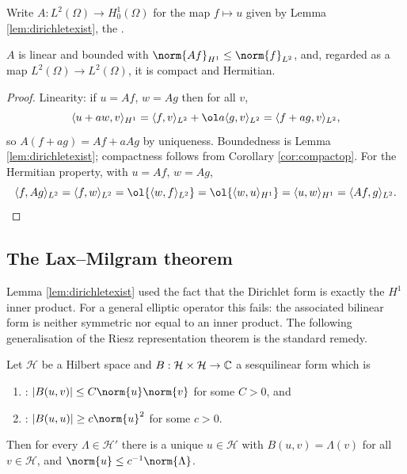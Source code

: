 \documentclass[a4paper]{scrartcl}
\newcommand{\ip}[2]{\langle #1, #2 \rangle}
\newcommand{\Hil}{\mathcal{H}}
\begin{document}
\begin{definition}
	Write $A : L^2(\Omega)\to H_0^1(\Omega)$ for the map $f \mapsto u$ given by Lemma \ref{lem:dirichletexist}, the .
\end{definition}

\begin{proposition}\label{prop:solop}
	$A$ is linear and bounded with $\norm{Af}_{H^1}\le\norm{f}_{L^2}$, and, regarded as a map $L^2(\Omega)\to L^2(\Omega)$, it is compact and Hermitian.
\end{proposition}

\begin{proof}
	Linearity: if $u = Af$, $w=Ag$ then for all $v$,
	$$\ip{u+aw}{v}_{H^1}=\ip{f}{v}_{L^2}+\ol a\ip{g}{v}_{L^2}=\ip{f+ag}{v}_{L^2},$$
	so $A(f+ag)=Af+aAg$ by uniqueness. Boundedness is Lemma \ref{lem:dirichletexist}; compactness follows from Corollary \ref{cor:compactop}. For the Hermitian property, with $u = Af$, $w = Ag$,
	$$\ip{f}{Ag}_{L^2}=\ip{f}{w}_{L^2}=\ol{\ip{w}{f}_{L^2}}=\ol{\ip{w}{u}_{H^1}}=\ip{u}{w}_{H^1}=\ip{Af}{g}_{L^2}. \qedhere$$
\end{proof}

\subsection{The Lax--Milgram theorem}

Lemma \ref{lem:dirichletexist} used the fact that the Dirichlet form is exactly the $H^1$ inner product. For a general elliptic operator this fails: the associated bilinear form is neither symmetric nor equal to an inner product. The following generalisation of the Riesz representation theorem is the standard remedy.

\begin{theorem}\label{thm:laxmilgram}
	Let $\Hil$ be a Hilbert space and $B : \Hil\times\Hil\to\C$ a sesquilinear form which is
	\begin{enumerate}[label=(\roman*)]
		\item {}: $|B(u,v)|\le C\norm{u}\norm{v}$ for some $C>0$, and
		\item {}: $|B(u,u)|\ge c\norm{u}^2$ for some $c>0$.
	\end{enumerate}
	Then for every $\Lambda \in \Hil'$ there is a unique $u \in \Hil$ with $B(u,v)=\Lambda(v)$ for all $v\in\Hil$, and $\norm{u}\le c^{-1}\norm{\Lambda}$.
\end{theorem}
\end{document}
